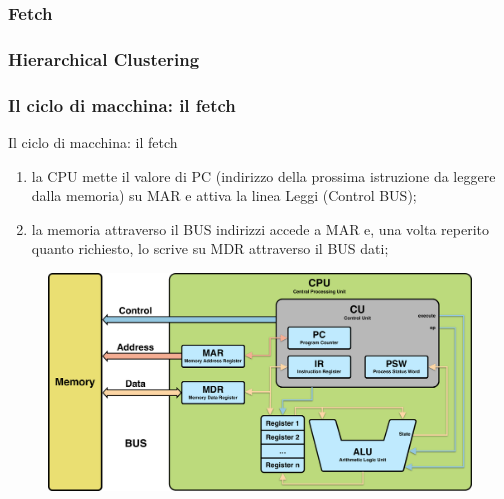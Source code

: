 \subsubsection[Fetch]{Fetch}
\begin{frame}
	\frametitle{{\color{GradientDescentDiagramGreen}Hierarchical Clustering}}
	\frametitle{Il ciclo di macchina: il {\color{CpuGreen}\textbf{fetch}}}
	
	\begin{block}{Il ciclo di macchina: il fetch}
		\begin{enumerate}
			\item la CPU mette il valore di PC (indirizzo della prossima istruzione da leggere dalla memoria) su MAR e attiva la linea Leggi (Control BUS);
			\item la memoria attraverso il BUS indirizzi accede a MAR e, una volta reperito quanto richiesto, lo scrive su MDR attraverso il BUS dati;
		\end{enumerate}
	\end{block}
	
	\begin{figure}[!htbp] 
		\centering
		\includegraphics[width=0.7\linewidth]{images/4_cpu/architecture_cpu_complex.pdf}
		\label{fig:cpu_complex}
	\end{figure}
	
\end{frame}


